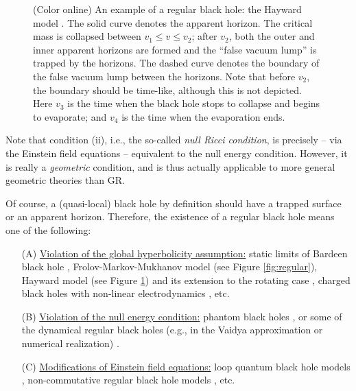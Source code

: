 \documentclass[12pt]{article}
\newcommand{\2}{$^2$}
\newcommand{\3}{$^3$}
\newcommand{\4}{$_4$}
\newcommand{\5}{$_5$}
\begin{document}
\begin{figure}
\begin{center}
\caption{\label{fig:regular_2}(Color online) An example of a regular black hole: the Hayward model \cite{Hayward:2005gi}. The solid curve denotes the apparent horizon. The critical mass is collapsed between $v_{1} \leqslant v \leqslant v_{2}$; after $v_{2}$, both the outer and inner apparent horizons are formed and the ``false vacuum lump'' is trapped by the horizons. The  dashed curve denotes the boundary of the false vacuum lump between the  horizons. Note that before $v_{2}$, the boundary should be time-like, although this is not depicted. Here $v_{3}$ is the time when the black hole stops to collapse and begins to evaporate; and $v_{4}$ is the time when the evaporation ends.}
\end{center}
\end{figure}


Note that condition (ii), i.e., the so-called \emph{null Ricci condition}, is precisely -- via the Einstein field equations -- equivalent to the null energy condition. However, it is really a \emph{geometric} condition, and is thus actually applicable to more general geometric theories than GR. 

Of course, a (quasi-local) black hole by definition should have a trapped surface or an apparent horizon. Therefore, the existence of a regular black hole means one of the following:
\begin{itemize}
\item[(A)] \underline{Violation of the global hyperbolicity assumption:} static limits of Bardeen black hole \cite{Bardeen}, Frolov-Markov-Mukhanov model (see Figure \ref{fig:regular})\cite{Frolov:1988vj}, Hayward model \cite{Hayward:2005gi} (see Figure \ref{fig:regular_2}) and its extension to the rotating case \cite{1410.4043}, charged black holes with non-linear electrodynamics \cite{AyonBeato:1999rg}, etc.
\item[(B)] \underline{Violation of the null energy condition:} phantom black holes \cite{Bronnikov:2005gm}, or some of the dynamical regular black holes (e.g., in the Vaidya approximation or numerical realization) \cite{Hayward:2005gi}.
\item[(C)] \underline{Modifications of Einstein field equations:} loop quantum black hole models \cite{Modesto:2005zm}, non-commutative regular black hole models \cite{Nicolini:2005vd}, etc.  
\end{itemize}
\end{document}
